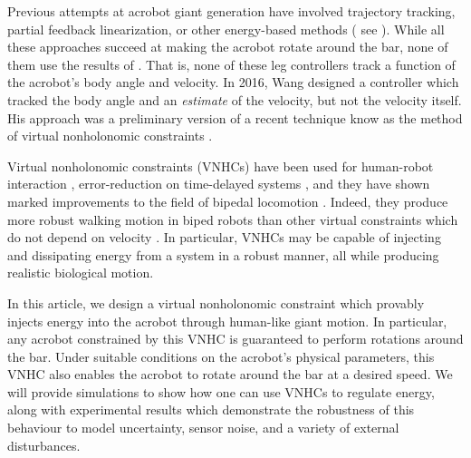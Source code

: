 \documentclass[journal,twoside,web, twocolumn,draftcls]{ieeecolor}
\begin{document}
Previous attempts at acrobot giant generation have involved
trajectory tracking, partial feedback linearization, or other energy-based
methods
( see
\cite{energy_pumping_robotic_swinging,swingup_giant_acrobot,dynamical_servo_acrobot_vc,control_giant_two_link_gymnastic_robot}
).
While all these approaches succeed at making the acrobot rotate around the
bar, none of them use the results of \cite{pendulum_length_giant_gymnastics}.
That is, none of these leg controllers track a function of the acrobot's body
angle and velocity.
In 2016, Wang designed a controller \cite{xingbo_thesis} which tracked the
body angle and an \textit{estimate} of the velocity, but not the velocity itself.
His approach was a preliminary version of a recent technique know as the method
of virtual nonholonomic constraints \cite{hybrid_zero_dynamics_bipedal_nhvcs}.

Virtual nonholonomic constraints (VNHCs) have been used for human-robot interaction
\cite{vnhc_human_robot_cooperation,psd_based_vnhc_redundant_manipulator,haptic_vnhc},
error-reduction on time-delayed systems \cite{vnhc_time_delay_teleop},
and they have shown marked improvements to the field of bipedal locomotion 
\cite{nhvc_dynamic_walking,
hybrid_zero_dynamics_bipedal_nhvcs,output_nhvc_bipedal_control}.
Indeed, they produce more robust walking motion in biped robots than
other virtual constraints which do not depend on velocity
\cite{nhvc_incline_walking}.
In particular, VNHCs may be capable of injecting and
dissipating energy from a system in a robust manner, all while producing
realistic biological motion. 

In this article, we design a virtual nonholonomic constraint which provably
injects energy into the acrobot through human-like giant motion.
In particular, any acrobot constrained by this VNHC is guaranteed to perform
rotations around the bar.
Under suitable conditions on the acrobot's physical parameters, this VNHC
also enables the acrobot to rotate around the bar at a desired speed.
We will provide simulations to show how one can use VNHCs to regulate energy,
along with experimental results which demonstrate the robustness of this
behaviour to model uncertainty, sensor noise, and a variety of external
disturbances. 
\end{document}
